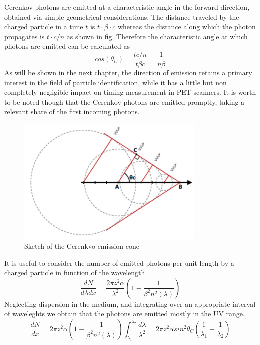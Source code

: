 Cerenkov photons are emitted at a characteristic angle in the forward direction, obtained via simple geometrical considerations. The distance traveled by the charged particle in a time $t$ is $t\cdot \beta \cdot c$ whereas the distance along which the photon propagates is $t\cdot c /n$ as shown in fig. %
Therefore the characteristic angle at which photons are emitted can be calculated as
\begin{equation}
cos(\theta _{C}) = \frac{t c/n}{t \beta c} = \frac{1}{n\beta}
\end{equation}
As will be shown in the next chapter, the direction of emission retains a primary interest in the field of particle identification, while it has a little but non completely negligible impact on timing measurement in PET scanners. It is worth to be noted though that the Cerenkov photons are emitted promptly, taking a relevant share of the first incoming photons.  
\begin{figure}
\centering
\includegraphics[width=9cm]{../Pictures/Chapter_2/cone.pdf}
\caption[Cerenkov emission cone]{Sketch of the Cerenkvo emission cone}
\label{fig:cone}
\end{figure}
It is useful to consider the number of emitted photons per unit length by a charged particle in function of the wavelength
\begin{equation}
\frac{dN}{d\lambda dx} = \frac{2\pi z^{2}\alpha}{\lambda ^{2}}\left( 1 - \frac{1}{\beta ^{2}n^{2}(\lambda)} \right)
\end{equation}
Neglecting dispersion in the medium, and integrating over an appropriate interval of waveleghts we obtain that the photons are emitted mostly in the UV range.
\begin{equation}
\frac{dN}{dx} = 2\pi z^{2} \alpha \left( 1-\frac{1}{\beta ^{2} n^{2} (\lambda)}\right) \int _{\lambda _{1}} ^{\lambda _{2}} \frac{d\lambda}{\lambda ^{2}}  = 2\pi z^{2}\alpha sin^{2}\theta _{C} \left( \frac{1}{\lambda _{1}}-\frac{1}{\lambda _{2}}\right)
\label{eq:number}
\end{equation}

